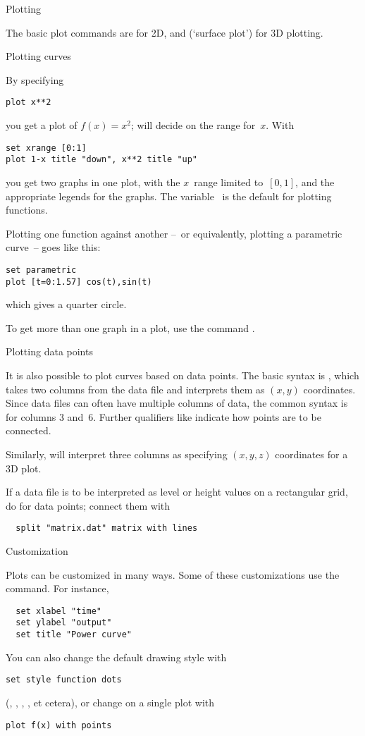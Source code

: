  {Plotting}

The basic plot commands are  for 2D, and  (`surface
plot') for 3D plotting.

 {Plotting curves}

By specifying
\begin{verbatim}
plot x**2
\end{verbatim}
you get a plot of $f(x)=x^2$;  will decide on the range
for~$x$.
With
\begin{verbatim}
set xrange [0:1]
plot 1-x title "down", x**2 title "up"
\end{verbatim}
you get two graphs in one plot, with the $x$~range limited to~$[0,1]$,
and the appropriate legends for the graphs. The variable~ is the
default for plotting functions.

Plotting one function against another --~or equivalently, plotting a
parametric curve~-- goes like this:
\begin{verbatim}
set parametric
plot [t=0:1.57] cos(t),sin(t)
\end{verbatim}
which gives a quarter circle.

To get more than one graph in a plot, use the command .

 {Plotting data points}

It is also possible to plot curves based on data points. The basic
syntax is , which takes two columns from the data
file and interprets them as $(x,y)$ coordinates. Since data files can often have
multiple columns of data, the common syntax is  for columns 3 and~6. Further qualifiers like  indicate how points are to be connected.

Similarly,  will interpret three
columns as specifying $(x,y,z)$ coordinates for a 3D plot.

If a data file is to be interpreted as level or height values on a
rectangular grid, do  for data points;
connect them with
\begin{verbatim}
  split "matrix.dat" matrix with lines
\end{verbatim}

 {Customization}

Plots can be customized in many ways. Some of these customizations use
the  command. For instance,
\begin{verbatim}
  set xlabel "time"
  set ylabel "output"
  set title "Power curve"
\end{verbatim}
You can also change the default drawing style with
\begin{verbatim}
set style function dots
\end{verbatim}
(, , , , et cetera), or
change on a single plot with
\begin{verbatim}
plot f(x) with points
\end{verbatim}

